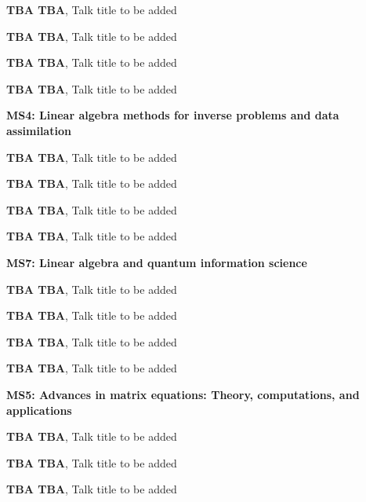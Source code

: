 \documentclass[ILAS2025-program.tex]{subfiles}
\begin{document}
\begin{description}
\begin{description}
    \item[] \textbf{TBA TBA}, Talk title to be added
        \item[] \textbf{TBA TBA}, Talk title to be added
        \item[] \textbf{TBA TBA}, Talk title to be added
        \item[] \textbf{TBA TBA}, Talk title to be added
        \end{description}
    \begin{description}
    \item[] \textbf{MS4: Linear algebra methods for inverse problems and data assimilation} 
    \item[] \textbf{TBA TBA}, Talk title to be added
        \item[] \textbf{TBA TBA}, Talk title to be added
        \item[] \textbf{TBA TBA}, Talk title to be added
        \item[] \textbf{TBA TBA}, Talk title to be added
        \end{description}
    \begin{description}
    \item[] \textbf{MS7: Linear algebra and quantum information science} 
    \item[] \textbf{TBA TBA}, Talk title to be added
        \item[] \textbf{TBA TBA}, Talk title to be added
        \item[] \textbf{TBA TBA}, Talk title to be added
        \item[] \textbf{TBA TBA}, Talk title to be added
        \end{description}
    \begin{description}
    \item[] \textbf{MS5: Advances in matrix equations: Theory, computations, and applications} 
    \item[] \textbf{TBA TBA}, Talk title to be added
        \item[] \textbf{TBA TBA}, Talk title to be added
        \item[] \textbf{TBA TBA}, Talk title to be added

\end{description}
\end{description}
\end{document}
